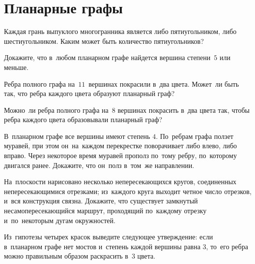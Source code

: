 
\section*{Планарные графы}


\begin{problems}

\item
Каждая грань выпуклого многогранника является либо пятиугольником, либо
шестиугольником.
Каким может быть количество пятиугольников?

\item
Докажите, что в~любом планарном графе найдется вершина степени~$5$ или меньше.

\item
Ребра полного графа на~$11$~вершинах покрасили в~два цвета.
Может~ли быть так, что ребра каждого цвета образуют планарный граф?

\item
Можно~ли ребра полного графа на~$8$ вершинах покрасить в~два цвета так, чтобы
ребра каждого цвета образовывали планарный граф?

\item
В~планарном графе все вершины имеют степень $4$.
По~ребрам графа ползет муравей, при этом он~на~каждом перекрестке поворачивает
либо влево, либо вправо.
Через некоторое время муравей прополз по~тому ребру, по~которому двигался
ранее.
Докажите, что он~полз в~том~же направлении.

\item
На~плоскости нарисовано несколько непересекающихся кругов, соединенных
непересекающимися отрезками;
из~каждого круга выходит четное число отрезков, и~вся конструкция связна.
Докажите, что существует замкнутый несамопересекающийся маршрут, проходящий
по~каждому отрезку и~по~некоторым дугам окружностей.

\item
Из~гипотезы четырех красок выведите следующее утверждение: если в~планарном
графе нет мостов и~степень каждой вершины равна $3$, то~его ребра можно
правильным образом раскрасить в~$3$ цвета.

\end{problems}

